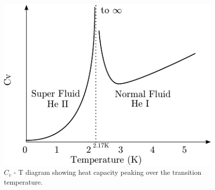 \begin{figure}[htb]
\centering
\includegraphics{pics/cvtdiagram.pdf}
\caption{$C_v$ - T diagram showing heat capacity peaking over the transition temperature. \label{fig:cvtdiagram}}
\end{figure}

